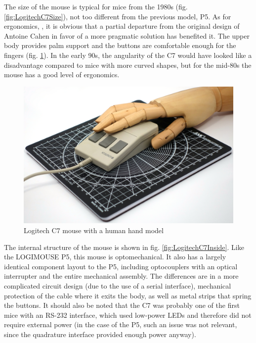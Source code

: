 \documentclass[11pt, a4paper]{article}
\begin{document}
The size of the mouse is typical for mice from the 1980s (fig. \ref{fig:LogitechC7Size}), not too different from the previous model, P5. As for ergonomics, , it is obvious that a partial departure from the original design of Antoine Cahen in favor of a more pragmatic solution has benefited it. The upper body provides palm support and the buttons are comfortable enough for the fingers (fig. \ref{fig:LogitechC7Hand}). In the early 90s, the angularity of the C7 would have looked like a disadvantage compared to mice with more curved shapes, but for the mid-80s the mouse has a good level of ergonomics.

\begin{figure}[h]
    \centering
    \includegraphics[scale=0.35]{1985_logitech_c7_mouse/hand_30.jpg}
    \caption{Logitech C7 mouse with a human hand model}
    \label{fig:LogitechC7Hand}
\end{figure}

The internal structure of the mouse is shown in fig. \ref{fig:LogitechC7Inside}. Like the LOGIMOUSE P5, this mouse is optomechanical. It also has a largely identical component layout to the P5, including optocouplers with an optical interrupter and the entire mechanical assembly. The differences are in a more complicated circuit design (due to the use of a serial interface), mechanical protection of the cable where it exits the body, as well as metal strips that spring the buttons. It should also be noted that the C7 was probably one of the first mice with an RS-232 interface, which used low-power LEDs and therefore did not require external power (in the case of the P5, such an issue was not relevant, since the quadrature interface provided enough power anyway).
\end{document}
